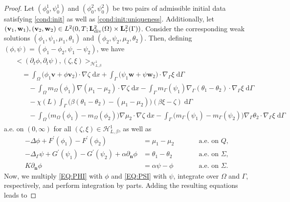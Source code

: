 \documentclass[10pt,reqno]{amsart}
\theoremstyle{remark}
\numberwithin{equation}{section}
\newcommand{\bigang}[2]{ \big< #1 , #2  \big>}
\newcommand{\n}{\mathbf{n}}
\newcommand{\bv}{\mathbf{v}}
\newcommand{\bw}{\mathbf{w}}
\newcommand{\intO}{\int_\Omega}
\newcommand{\intG}{\int_\Gamma}
\newcommand{\dx}{\;\mathrm{d}x}
\newcommand{\dG}{\;\mathrm d\Ga}
\newcommand{\delt}{\partial_{t}}
\newcommand{\deln}{\partial_\n}
\newcommand{\Grad}{\nabla}
\newcommand{\Lap}{\Delta}
\newcommand{\Div}{\textnormal{div}}
\newcommand{\Gradg}{\nabla_\Ga}
\newcommand{\Lapg}{\Delta_\Ga}
\newcommand{\Om}{\Omega}
\newcommand{\Ga}{\Gamma}
\begin{document}
\begin{proof}
    Let $(\phi_0^1,\psi_0^1)$ and $(\phi_0^2,\psi_0^2)$ be two pairs of admissible initial data satisfying \eqref{cond:init} as well as \eqref{cond:init:uniqueness}.     Additionally, let $(\bv_1,\bw_1), (\bv_2,\bw_2)\in L^2(0,T;\mathbf{L}^2_\Div(\Om)\times\mathbf{L}^2_\tau(\Ga))$. Consider the corresponding weak solutions $(\phi_1,\psi_1,\mu_1,\theta_1)$ and $(\phi_2,\psi_2,\mu_2,\theta_2)$. 
    Then, defining $(\phi,\psi) = (\phi_1 - \phi_2, \psi_1 - \psi_2)$, we have
    \begin{align}\label{EQ:DELT:PHIPSI}
        \begin{split}
            &\bigang{(\delt\phi,\delt\psi)}{(\zeta,\xi)}_{\mathcal{H}^1_{L,\beta}} \\
            &\quad = \intO \big(\phi_1\bv + \phi\bv_2\big)\cdot\Grad\zeta\dx + \intG \big(\psi_1\bw + \psi\bw_2\big)\cdot\Gradg\xi\dG \\
            &\qquad - \intO m_\Om(\phi_1)\Grad(\mu_1 - \mu_2)\cdot\Grad\zeta\dx - \intG m_\Ga(\psi_1)\Gradg(\theta_1 - \theta_2)\cdot\Gradg\xi\dG \\
            &\qquad - \chi(L) \intG \big(\beta(\theta_1 - \theta_2) - (\mu_1 - \mu_2)\big)(\beta\xi - \zeta)\dG \\
            &\qquad - \intO \big(m_\Om(\phi_1) - m_\Om(\phi_2)\big)\Grad\mu_2\cdot\Grad\zeta\dx - \intG \big(m_\Ga(\psi_1) - m_\Ga(\psi_2)\big)\Gradg\theta_2\cdot\Gradg\xi\dG
        \end{split}
    \end{align}
    a.e. on $(0,\infty)$ for all $(\zeta,\xi)\in\mathcal{H}^1_{L,\beta}$, as well as
    \begin{subequations}\label{EQ:UNIQUENESS}
        \begin{alignat}{2}
        	-\Lap\phi + F^\prime(\phi_1) - F^\prime(\phi_2) &= \mu_1 - \mu_2 &&\qquad\text{a.e.~on~}Q, \label{EQ:PHI}\\
        	-\Lapg\psi + G^\prime(\psi_1) - G^\prime(\psi_2) + \alpha\deln\phi &= \theta_1 - \theta_2 &&\qquad\text{a.e.~on~}\Sigma, \label{EQ:PSI} \\
            K\deln\phi &= \alpha\psi - \phi &&\qquad\text{a.e.~on~}\Sigma. \label{EQ:BC:PHI}
        \end{alignat}
    \end{subequations}
    Now, we multiply \eqref{EQ:PHI} with $\phi$ and \eqref{EQ:PSI} with $\psi$, integrate over $\Om$ and $\Ga$, respectively, and perform integration by parts. Adding the resulting equations leads to

\end{proof}
\end{document}
